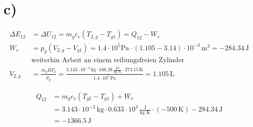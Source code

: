 

\section*{c)}

\begin{align*}
\Delta E_{12} &= \Delta U_{12} = m_g c_v (T_{2,g} - T_{g1}) = Q_{12} - W_v \\
W_v &= p_{g} (V_{2,g} - V_{g1}) = 1.4 \cdot 10^5 \text{Pa} \cdot (1.105 - 3.14) \cdot 10^{-3} \, \text{m}^3 = -284.34 \, \text{J} \\
&\text{weiterhin Arbeit an einem reibungsfreien Zylinder} \\
V_{2,g} &= \frac{m_g R T_2}{p_{g}} = \frac{3.143 \cdot 10^{-3} \, \text{kg} \cdot 166.28 \, \frac{\text{kJ}}{\text{kg K}} \cdot 273.15 \, \text{K}}{1.4 \cdot 10^5 \, \text{Pa}} = 1.105 \, \text{L}
\end{align*}

\begin{align*}
Q_{12} &= m_g c_v (T_{g2} - T_{g1}) + W_v \\
&= 3.143 \cdot 10^{-3} \, \text{kg} \cdot 0.633 \cdot 10^3 \, \frac{\text{J}}{\text{kg K}} \cdot (-500 \, \text{K}) - 284.34 \, \text{J} \\
&= -1366.5 \, \text{J}
\end{align*}
